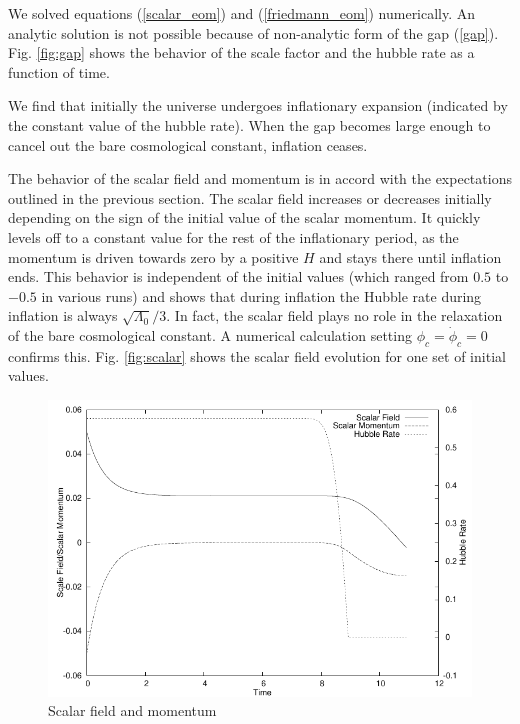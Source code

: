 \begin{doublespace}
We solved equations (\ref{scalar_eom}) and (\ref{friedmann_eom})
numerically. An analytic solution is not possible because of
non-analytic form of the gap (\ref{gap}). Fig. \ref{fig:gap} shows
the behavior of the scale factor and the hubble rate as a function
of time.

We find that initially the universe undergoes inflationary expansion
(indicated by the constant value of the hubble rate). When the gap
becomes large enough to cancel out the bare cosmological constant,
inflation ceases.

The behavior of the scalar field and momentum is in accord with the
expectations outlined in the previous section. The scalar field
increases or decreases initially depending on the sign of the
initial value of the scalar momentum. It quickly levels off to a
constant value for the rest of the inflationary period, as the
momentum is driven towards zero by a positive $H$ and stays there
until inflation ends. This behavior is independent of the initial
values (which ranged from $0.5$ to $-0.5$ in various runs) and shows
that during inflation the Hubble rate during inflation is always
$\sqrt{\Lambda_0}/3$. In fact, the scalar field plays no role in the
relaxation of the bare cosmological constant. A numerical
calculation setting $\phi_c = \dot \phi_c = 0$ confirms this. Fig.
\ref{fig:scalar} shows the scalar field evolution for one set of
initial values.

\begin{figure}[htp]\label{fig:scalar_field}
\centering
\includegraphics[scale=0.6]{figures/cosmological_condensate/scalar.pdf}
\caption{Scalar field and momentum}
\end{figure}



\end{doublespace}
